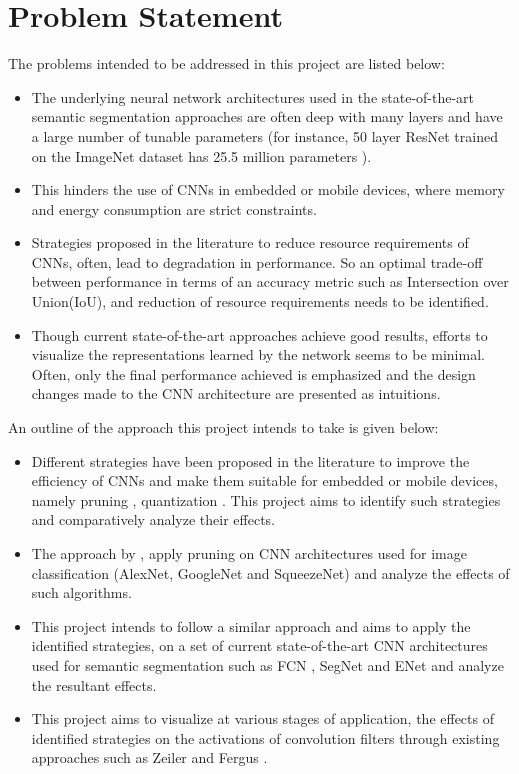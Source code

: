 \documentclass[a4paper,12pt]{article}
\begin{document}
\section{Problem Statement}
The problems intended to be addressed in this project are listed below:
	\begin{itemize}
		\item The underlying neural network architectures used in the state-of-the-art semantic segmentation approaches are often deep with many layers and have a large number of tunable parameters (for instance, 50 layer ResNet trained on the ImageNet dataset has 25.5 million parameters \cite{8}). 
		\item This hinders the use of CNNs in embedded or mobile devices, where memory and energy consumption are strict constraints.
		\item Strategies proposed in the literature to reduce resource requirements of CNNs, often, lead to degradation in performance. So an optimal trade-off between performance in terms of an accuracy metric such as Intersection over Union(IoU), and reduction of resource requirements needs to be identified.
		\item Though current state-of-the-art approaches achieve good results, efforts to visualize the representations learned by the network seems to be minimal. Often, only the final performance achieved is emphasized and the design changes made to the CNN architecture are presented as intuitions.
	\end{itemize}
An outline of the approach this project intends to take is given below:
	\begin{itemize}
		\item Different strategies have been proposed in the literature to improve the efficiency of CNNs and make them suitable for embedded or mobile devices, namely pruning \cite{9}, quantization \cite{12}. This project aims to identify such strategies and comparatively analyze their effects.
		\item The approach by \cite{13}, apply pruning on CNN architectures used for image classification (AlexNet, GoogleNet and SqueezeNet) and analyze the effects of such algorithms.
		\item This project intends to follow a similar approach and aims to apply the identified strategies, on a set of current state-of-the-art CNN architectures used for semantic segmentation such as FCN \cite{6}, SegNet \cite{7} and ENet \cite{11} and analyze the resultant effects.
		\item This project aims to visualize at various stages of application, the effects of identified strategies on the activations of convolution filters through existing approaches such as Zeiler and Fergus \cite{14}.
	\end{itemize}
\end{document}
